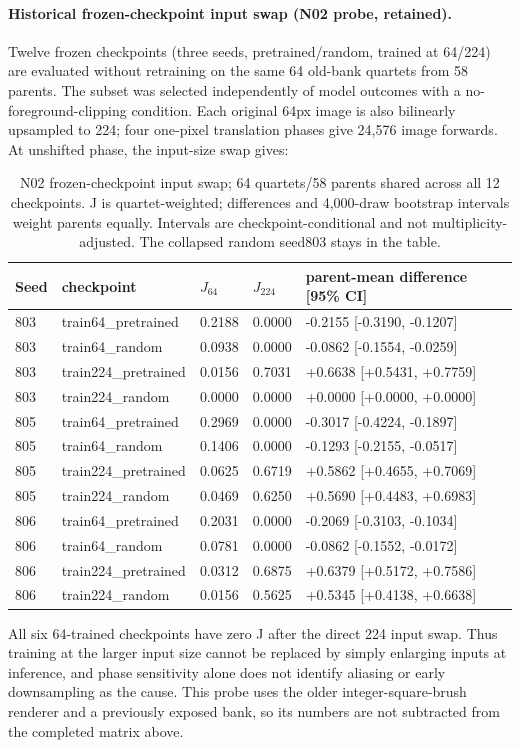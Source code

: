 \paragraph{Historical frozen-checkpoint input swap (N02 probe, retained).} Twelve frozen checkpoints (three seeds, pretrained/random, trained at 64/224) are evaluated without retraining on the same 64 old-bank quartets from 58 parents. The subset was selected independently of model outcomes with a no-foreground-clipping condition. Each original 64px image is also bilinearly upsampled to 224; four one-pixel translation phases give 24,576 image forwards. At unshifted phase, the input-size swap gives:
\begin{table}[t]\centering\small\begin{tabular}{@{}lllll@{}}\toprule
Seed & checkpoint & $J_{64}$ & $J_{224}$ & parent-mean difference [95\% CI] \\
\midrule
803 & train64\_pretrained & 0.2188 & 0.0000 & -0.2155 [-0.3190, -0.1207] \\
803 & train64\_random & 0.0938 & 0.0000 & -0.0862 [-0.1554, -0.0259] \\
803 & train224\_pretrained & 0.0156 & 0.7031 & +0.6638 [+0.5431, +0.7759] \\
803 & train224\_random & 0.0000 & 0.0000 & +0.0000 [+0.0000, +0.0000] \\
805 & train64\_pretrained & 0.2969 & 0.0000 & -0.3017 [-0.4224, -0.1897] \\
805 & train64\_random & 0.1406 & 0.0000 & -0.1293 [-0.2155, -0.0517] \\
805 & train224\_pretrained & 0.0625 & 0.6719 & +0.5862 [+0.4655, +0.7069] \\
805 & train224\_random & 0.0469 & 0.6250 & +0.5690 [+0.4483, +0.6983] \\
806 & train64\_pretrained & 0.2031 & 0.0000 & -0.2069 [-0.3103, -0.1034] \\
806 & train64\_random & 0.0781 & 0.0000 & -0.0862 [-0.1552, -0.0172] \\
806 & train224\_pretrained & 0.0312 & 0.6875 & +0.6379 [+0.5172, +0.7586] \\
806 & train224\_random & 0.0156 & 0.5625 & +0.5345 [+0.4138, +0.6638] \\
\bottomrule\end{tabular}\caption{N02 frozen-checkpoint input swap; 64 quartets/58 parents shared across all 12 checkpoints. J is quartet-weighted; differences and 4,000-draw bootstrap intervals weight parents equally. Intervals are checkpoint-conditional and not multiplicity-adjusted. The collapsed random seed803 stays in the table.}\end{table}
All six 64-trained checkpoints have zero J after the direct 224 input swap. Thus training at the larger input size cannot be replaced by simply enlarging inputs at inference, and phase sensitivity alone does not identify aliasing or early downsampling as the cause. This probe uses the older integer-square-brush renderer and a previously exposed bank, so its numbers are not subtracted from the completed matrix above.
